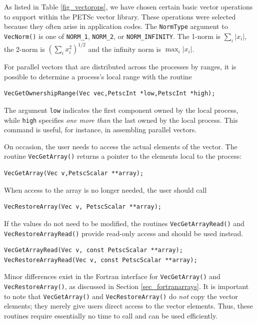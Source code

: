 As listed in Table \ref{fig_vectorops}, we have chosen certain
basic vector operations to support within the PETSc vector library.
These operations were selected because they often arise in application
codes. The \lstinline{NormType} argument to \lstinline{VecNorm()} is one of
\lstinline{NORM_1}, \lstinline{NORM_2}, or \lstinline{NORM_INFINITY}.
  The 1-norm is
$ \sum_i |x_{i}|$, the 2-norm is $( \sum_{i} x_{i}^{2})^{1/2} $ and the
infinity norm is $ \max_{i} |x_{i}|$.

For parallel vectors that are distributed across the processes by ranges,
it is possible to determine
a process's local range with the routine
\begin{lstlisting}
VecGetOwnershipRange(Vec vec,PetscInt *low,PetscInt *high);
\end{lstlisting}
The argument \lstinline{low} indicates the first component owned by the local
process, while \lstinline{high} specifies {\em one more than} the
last owned by the local process.
This command is useful, for instance, in assembling parallel vectors.

On occasion, the user needs to access the actual elements of the vector.
The routine \lstinline{VecGetArray()}
returns a pointer to the elements local to the process:
\begin{lstlisting}
VecGetArray(Vec v,PetscScalar **array);
\end{lstlisting}
When access to the array is no longer
needed, the user should call
\begin{lstlisting}
VecRestoreArray(Vec v, PetscScalar **array);
\end{lstlisting}
If the values do not need to be modified, the routines \lstinline{VecGetArrayRead()} and \break\lstinline{VecRestoreArrayRead()} provide read-only access and should be used instead.
\begin{lstlisting}
VecGetArrayRead(Vec v, const PetscScalar **array);
VecRestoreArrayRead(Vec v, const PetscScalar **array);
\end{lstlisting}
Minor differences exist in the Fortran interface for \lstinline{VecGetArray()} and
\lstinline{VecRestoreArray()}, as discussed in Section \ref{sec_fortranarrays}.
It is important to note that \lstinline{VecGetArray()} and \lstinline{VecRestoreArray()}
do {\em not} copy the vector elements; they merely give users direct
access to the vector elements. Thus, these routines require essentially
no time to call and can be used efficiently.

